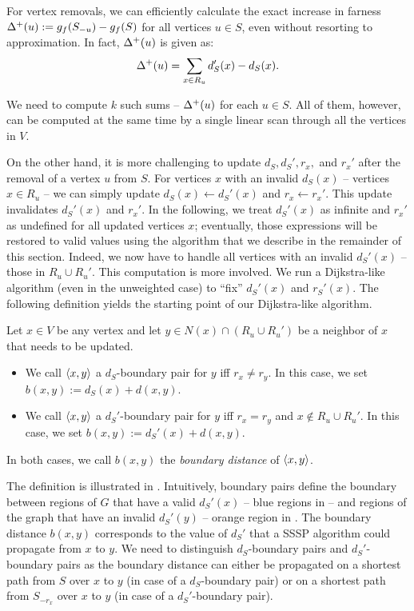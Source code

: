 For vertex removals, we can efficiently calculate the exact increase in farness
$\Delta^+(u) := g_f(S_{-u}) - g_f(S)$ for all vertices $u \in S$, even
without resorting to approximation. In fact, $\Delta^+(u)$ is given as:
%
\[
\Delta^+(u) = \sum_{x \in R_u}d_S'(x) - d_S(x).
\]

We need to compute $k$ such sums -- \ie $\Delta^+(u)$ for each $u \in S$.
All of them, however, can be computed at the same time by a single linear scan
through all the vertices in $V$.

On the other hand, it is more challenging to update $d_S, d_S', r_x,$ and
$r_x'$ after the removal of a vertex $u$ from $S$. For vertices $x$ with an
invalid $d_S(x)$ -- \ie vertices $x \in R_u$ -- we can simply update $d_S(x) \gets
d_S'(x)$ and $r_x \gets r_x'$. This update invalidates $d_S'(x)$ and $r_x'$. In
the following, we treat $d_S'(x)$ as infinite and $r_x'$ as undefined for all
updated vertices $x$; eventually, those expressions will be restored to valid
values using the algorithm that we describe in the remainder of this section.
Indeed, we now have to handle all vertices with an invalid $d_S'(x)$ -- \ie
those in $R_u\cup R_u'$. This computation is more involved.
%
We run a Dijkstra-like algorithm (even in the unweighted case) to \enquote{fix}
$d_S'(x)$ and $r_S'(x)$. The following definition yields the starting point of
our Dijkstra-like algorithm.

\begin{definition}
Let $x \in V$ be any vertex and let $y \in N(x) \cap (R_u \cup R_u')$ be a neighbor
of $x$ that needs to be updated.

\begin{itemize}
    \item We call $\pair{x}{y}$ a $d_S$-boundary pair for $y$ iff $r_x \neq r_y$.
        In this case, we set $b(x, y) := d_S(x) + d(x, y)$.
    \item We call $\pair{x}{y}$ a $d_S'$-boundary pair for $y$ iff $r_x = r_y$
        and $x \notin R_u \cup R_u'$. In this case, we set $b(x, y) := d_S'(x)
        + d(x, y)$.
\end{itemize}

In both cases, we call $b(x, y)$ the \emph{boundary distance} of $\pair{x}{y}$.
\end{definition}

The definition is illustrated in . Intuitively,
boundary pairs define the boundary between regions of $G$ that have a valid
$d_S'(x)$ -- blue regions in  -- and regions of the
graph that have an invalid $d_S'(y)$ -- orange region in
.
%
The boundary distance $b(x, y)$ corresponds to the value of $d_S'$ that a SSSP
algorithm could propagate from $x$ to $y$. We need to distinguish $d_S$-boundary
pairs and $d_S'$-boundary pairs as the boundary distance can either be
propagated on a shortest path from $S$ over $x$ to $y$ (in case of a
$d_S$-boundary pair) or on a shortest path from $S_{-r_x}$ over $x$ to $y$ (in
case of a $d_S'$-boundary pair).

